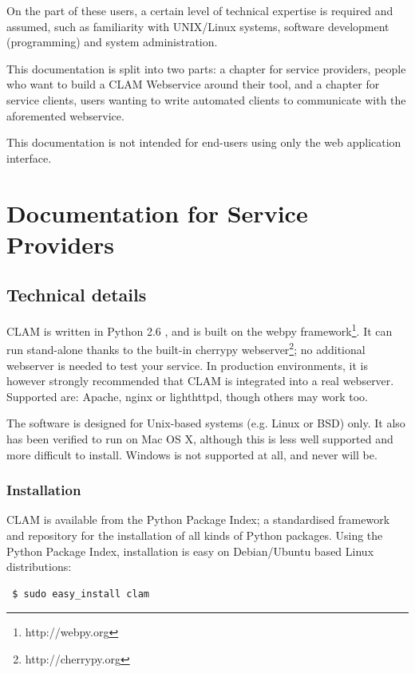 \documentclass[a4paper,12pt]{report}
\begin{document}
On the part of these users, a certain level of technical expertise is required
and assumed, such as familiarity with UNIX/Linux systems, software development
(programming) and system administration.  

This documentation is split into two parts: a chapter for service providers,
people who want to build a CLAM Webservice around their tool, and a chapter for
service clients, users wanting to write automated clients to communicate with
the aforemented webservice.

This documentation is not intended for end-users using only the web application
interface. 

\chapter{Documentation for Service Providers}

\section{Technical details}

CLAM is written in Python 2.6 \cite{PYTHON}, and is built on the webpy
framework\footnote{http://webpy.org}. It can run
stand-alone thanks to the built-in cherrypy
webserver\footnote{http://cherrypy.org}; no additional webserver
is needed to test your service. In production environments, it is however
strongly recommended that CLAM is integrated into a real webserver. Supported
are: Apache, nginx or lighthttpd, though others may work too.

The software is designed for Unix-based systems (e.g. Linux or BSD) only. It
also has been verified to run on Mac OS X, although this is less well supported
and more difficult to install. Windows is not supported at all, and never will
be.

\subsection{Installation}

CLAM is available from the Python Package Index; a standardised framework and
repository for the installation of all kinds of Python packages. Using the
Python Package Index, installation is easy on Debian/Ubuntu based Linux
distributions:

\begin{verbatim} $ sudo easy_install clam \end{verbatim}
\end{document}

